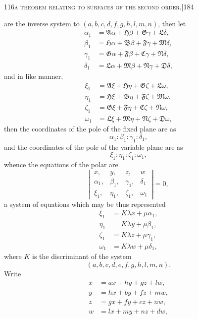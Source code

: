 \documentclass[11pt]{article}
\begin{document}
\begin{center}\small\textsc{116}\hfill\textsc{a theorem relating to surfaces of the second order.}\hfill[184\end{center}

\medskip
\noindent are the inverse system to $(a,b,c,d,f,g,h,l,m,n)$, then let
\[
\begin{aligned}
\alpha_{1} &= \mathfrak{A}\alpha + \mathfrak{H}\beta + \mathfrak{G}\gamma + \mathfrak{L}\delta,\\
\beta_{1} &= \mathfrak{H}\alpha + \mathfrak{B}\beta + \mathfrak{F}\gamma + \mathfrak{M}\delta,\\
\gamma_{1} &= \mathfrak{G}\alpha + \mathfrak{F}\beta + \mathfrak{C}\gamma + \mathfrak{N}\delta,\\
\delta_{1} &= \mathfrak{L}\alpha + \mathfrak{M}\beta + \mathfrak{N}\gamma + \mathfrak{D}\delta,
\end{aligned}
\]
and in like manner,
\[
\begin{aligned}
\xi_{1} &= \mathfrak{A}\xi + \mathfrak{H}\eta + \mathfrak{G}\zeta + \mathfrak{L}\omega,\\
\eta_{1} &= \mathfrak{H}\xi + \mathfrak{B}\eta + \mathfrak{F}\zeta + \mathfrak{M}\omega,\\
\zeta_{1} &= \mathfrak{G}\xi + \mathfrak{F}\eta + \mathfrak{C}\zeta + \mathfrak{N}\omega,\\
\omega_{1} &= \mathfrak{L}\xi + \mathfrak{M}\eta + \mathfrak{N}\zeta + \mathfrak{D}\omega,
\end{aligned}
\]
then the coordinates of the pole of the fixed plane are as
\[
\alpha_{1} : \beta_{1} : \gamma_{1} : \delta_{1},
\]
and the coordinates of the pole of the variable plane are as
\[
\xi_{1} : \eta_{1} : \zeta_{1} : \omega_{1},
\]
whence the equations of the polar are
\[
\left|\,\begin{array}{cccc}
x, & y, & z, & w\\
\alpha_{1}, & \beta_{1}, & \gamma_{1}, & \delta_{1}\\
\xi_{1}, & \eta_{1}, & \zeta_{1}, & \omega_{1}
\end{array}\,\right| = 0,
\]
a system of equations which may be thus represented
\[
\begin{aligned}
\xi_{1} &= K\lambda x + \mu\alpha_{1},\\
\eta_{1} &= K\lambda y + \mu\beta_{1},\\
\zeta_{1} &= K\lambda z + \mu\gamma_{1},\\
\omega_{1} &= K\lambda w + \mu\delta_{1},
\end{aligned}
\]
where $K$ is the discriminant of the system
\[
(a,b,c,d,e,f,g,h,l,m,n).
\]
Write
\[
\begin{aligned}
x &= ax + hy + gz + lw,\\
y &= hx + by + fz + mw,\\
z &= gx + fy + cz + nw,\\
w &= lx + my + nz + dw,
\end{aligned}
\]
\end{document}
